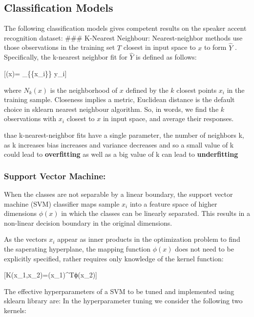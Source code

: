 \documentclass[11pt]{article}
\begin{document}
    

    \hypertarget{classification-models}{%
\subsection{Classification Models}\label{classification-models}}

    The following classification models gives competent results on the
speaker accent recognition dataset: \#\#\# K-Nearest Neighbour:
Nearest-neighbor methods use those observations in the training set
\(T\) closest in input space to \(x\) to form \(\hat{Y}\) .
Specifically, the k-nearest neighbor fit for \(\hat{Y}\) is defined as
follows:

{[}(x)= \sum\_\{\{x\_i\}\} y\_i{]}

where \(N_k(x)\) is the neighborhood of \(x\) defined by the \(k\)
closest points \(x_i\) in the training sample. Closeness implies a
metric, Euclidean distance is the default choice in sklearn nearest
neighbour algorithm. So, in words, we find the \(k\) observations with
\(x_i\) closest to \(x\) in input space, and average their responses.

thae k-nearest-neighbor fits have a single parameter, the number of
neighbors k, as k increases bias increases and variance decreases and so
a small value of k could lead to \textbf{overfitting} as well as a big
value of k can lead to \textbf{underfitting}

    \hypertarget{support-vector-machine}{%
\subsubsection{Support Vector Machine:}\label{support-vector-machine}}

When the classes are not separable by a linear boundary, the support
vector machine (SVM) classifier maps sample \(x_i\) into a feature space
of higher dimensions \(\phi (x)\) in which the classes can be linearly
separated. This results in a non-linear decision boundary in the
original dimensions.

As the vectors \(x_i\) appear as inner products in the optimization
problem to find the saperating hyperplane, the mapping function
\(\phi(x)\) does not need to be explicitly specified, rather requires
only knowledge of the kernel function:

{[}K(x\_1,x\_2)=\phi(x\_1)\^{}Tϕ(x\_2){]}

The effective hyperparameters of a SVM to be tuned and implemented using
sklearn library are: In the hyperparameter tuning we consider the
following two kernels:
\end{document}

